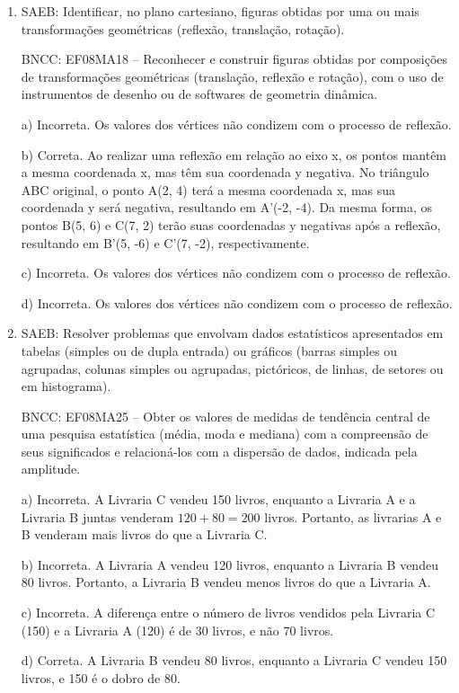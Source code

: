 \begin{enumerate}
\item SAEB: Identificar, no plano cartesiano, figuras obtidas por uma ou mais
transformações geométricas (reflexão, translação, rotação).

BNCC: EF08MA18 -- Reconhecer e construir figuras obtidas por composições
de transformações geométricas (translação, reflexão e rotação), com o
uso de instrumentos de desenho ou de softwares de geometria dinâmica.

a) Incorreta. Os valores dos vértices não condizem com o processo
de reflexão.

b) Correta. Ao realizar uma reflexão em relação ao eixo x, os
pontos mantêm a mesma coordenada x, mas têm sua coordenada y negativa.
No triângulo ABC original, o ponto A(2, 4) terá a mesma coordenada x,
mas sua coordenada y será negativa, resultando em A'(-2, -4). Da mesma
forma, os pontos B(5, 6) e C(7, 2) terão suas coordenadas y negativas
após a reflexão, resultando em B'(5, -6) e C'(7, -2), respectivamente.

c) Incorreta. Os valores dos vértices não condizem com o processo
de reflexão.

d) Incorreta. Os valores dos vértices não condizem com o processo
de reflexão.

\item SAEB: Resolver problemas que envolvam dados estatísticos apresentados em
tabelas (simples ou de dupla entrada) ou gráficos (barras simples ou
agrupadas, colunas simples ou agrupadas, pictóricos, de linhas, de
setores ou em histograma).

BNCC: EF08MA25 -- Obter os valores de medidas de tendência central de
uma pesquisa estatística (média, moda e mediana) com a compreensão de
seus significados e relacioná-los com a dispersão de dados, indicada
pela amplitude.

a) Incorreta. A Livraria C vendeu 150 livros, enquanto a Livraria A
e a Livraria B juntas venderam $120 + 80 = 200$ livros. Portanto, as
livrarias A e B venderam mais livros do que a Livraria C.

b) Incorreta. A Livraria A vendeu 120 livros, enquanto a Livraria B
vendeu 80 livros. Portanto, a Livraria B vendeu menos livros do que a
Livraria A.

c) Incorreta. A diferença entre o número de livros vendidos pela
Livraria C (150) e a Livraria A (120) é de 30 livros, e não 70 livros.

d) Correta. A Livraria B vendeu 80 livros, enquanto a Livraria C
vendeu 150 livros, e 150 é o dobro de 80.
\end{enumerate}


